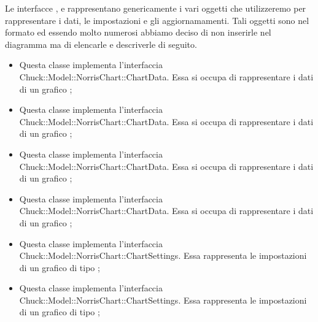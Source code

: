 	Le interfacce ,  e  rappresentano genericamente i vari oggetti che utilizzeremo per rappresentare i dati, le impostazioni e gli aggiornamamenti. Tali oggetti sono nel formato  ed essendo molto numerosi abbiamo deciso di non inserirle nel diagramma ma di elencarle e descriverle di seguito.

	\begin{itemize}
		\item {} Questa classe implementa l'interfaccia \linebreak Chuck::Model::NorrisChart::ChartData. Essa si occupa di rappresentare i dati di un grafico ;

		\item {} Questa classe implementa l'interfaccia \linebreak Chuck::Model::NorrisChart::ChartData. Essa si occupa di rappresentare i dati di un grafico ;

		\item {} Questa classe implementa l'interfaccia \linebreak Chuck::Model::NorrisChart::ChartData. Essa si occupa di rappresentare i dati di un grafico ;

		\item {} Questa classe implementa l'interfaccia \linebreak Chuck::Model::NorrisChart::ChartData. Essa si occupa di rappresentare i dati di un grafico ;

		\item {} Questa classe implementa l'interfaccia \linebreak Chuck::Model::NorrisChart::ChartSettings. Essa rappresenta le impostazioni di un grafico di tipo ;

		\item {} Questa classe implementa l'interfaccia \linebreak Chuck::Model::NorrisChart::ChartSettings. Essa rappresenta le impostazioni di un grafico di tipo ;


\end{itemize}
